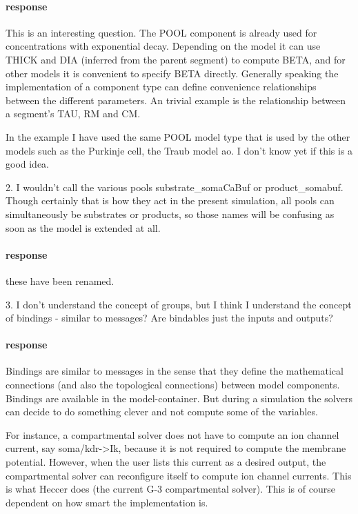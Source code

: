 \documentclass[12pt]{article}
\begin{document}
\paragraph{response} This is an interesting question.  The POOL
component is already used for concentrations with exponential decay.
Depending on the model it can use THICK and DIA (inferred from the
parent segment) to compute BETA, and for other models it is convenient
to specify BETA directly.  Generally speaking the implementation of a
component type can define convenience relationships between the
different parameters.  An trivial example is the relationship between
a segment's TAU, RM and CM.

In the example I have used the same POOL model type that is used by
the other models such as the Purkinje cell, the Traub model ao.  I
don't know yet if this is a good idea.


2. I wouldn't call the various pools substrate\_somaCaBuf or
product\_somabuf.  Though certainly that is how they act in the
present simulation, all pools can simultaneously be substrates or
products, so those names will be confusing as soon as the model is
extended at all.

\paragraph{response} these have been renamed.


3. I don't understand the concept of groups, but I think I understand
the concept of bindings - similar to messages?  Are bindables just the
inputs and outputs?

\paragraph{response} Bindings are similar to messages in the sense
that they define the mathematical connections (and also the
topological connections) between model components.  Bindings are
available in the model-container.  But during a simulation the solvers
can decide to do something clever and not compute some of the
variables.

For instance, a compartmental solver does not have to compute an ion
channel current, say soma/kdr->Ik, because it is not required to
compute the membrane potential.  However, when the user lists this
current as a desired output, the compartmental solver can reconfigure
itself to compute ion channel currents.  This is what Heccer does (the
current G-3 compartmental solver).  This is of course dependent on how
smart the implementation is.
\end{document}
